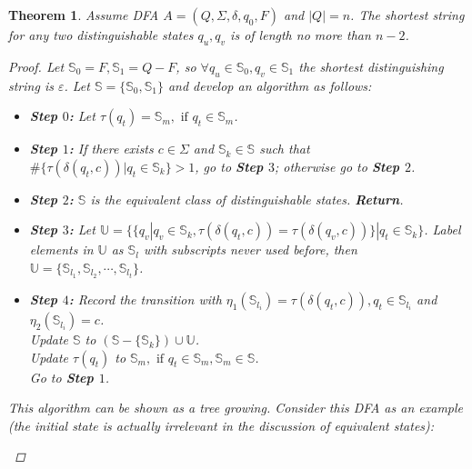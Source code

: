 \documentclass[a4paper]{article}
\newtheorem{theorem}{Theorem}
\newtheorem*{proof}{Proof}
\newcommand{\Sset}{\mathbb{S}}
\newcommand{\Uset}{\mathbb{U}}
\begin{document}
\begin{theorem}\label{n-2}
    Assume DFA $A=(Q,\Sigma,\delta,q_0,F)$ and $|Q|=n$.
    The shortest string for any two distinguishable states $q_u,q_v$
    is of length no more than $n-2$.
    \begin{proof}
        Let $\Sset_0=F,\Sset_1=Q-F$, so $\forall q_u\in\Sset_0,q_v\in\Sset_1$ the 
        shortest distinguishing string is $\varepsilon$.
        Let $\Sset=\{\Sset_0,\Sset_1\}$ and develop an algorithm as follows:
        \begin{itemize}
            \item \textbf{Step $0$:} Let $\tau(q_t)=\Sset_m,\text{ if }q_t\in\Sset_m$.
            \item \textbf{Step $1$:} If there exists $c\in\Sigma$ and $\Sset_k\in\Sset$ such
                that $\#\{\tau(\delta(q_t,c))|q_t\in\Sset_k\}>1$, go to \textbf{Step $3$};
                otherwise go to \textbf{Step $2$}.
            \item \textbf{Step $2$:} $\Sset$ is the equivalent
                class of distinguishable states. \textbf{Return}.
            \item \textbf{Step $3$:} Let 
                $\Uset=\{\{q_v|q_v\in\Sset_k,\tau(\delta(q_t,c))=\tau(\delta(q_v,c))\}
                |q_t\in\Sset_k\}$.
                Label elements in $\Uset$ as $\Sset_l$ with subscripts never used before,
                then $\Uset=\{\Sset_{l_1},\Sset_{l_2},\cdots,\Sset_{l_t}\}$.
            \item \textbf{Step $4$:} Record the transition with 
                $\eta_1(\Sset_{l_i})=\tau(\delta(q_t,c)),q_t\in\Sset_{l_i}$ and 
                $\eta_2(\Sset_{l_i})=c$.\\
                Update $\Sset$ to $(\Sset-\{\Sset_k\})\cup\Uset$.\\
                Update $\tau(q_t)$ to $\Sset_m,\text{ if }q_t\in\Sset_m,\Sset_m\in\Sset$.\\
                Go to \textbf{Step $1$}.
        \end{itemize}
    This algorithm can be shown as a tree growing. Consider this DFA as an example (the initial state
    is actually irrelevant in the discussion of equivalent states):
    \begin{center}
\end{center}
\end{proof}
\end{theorem}
\end{document}
